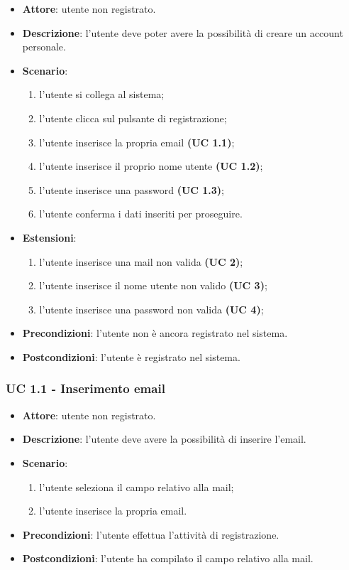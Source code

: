 \begin{itemize}
    \item \textbf{Attore}: utente non registrato.
    \item \textbf{Descrizione}: l'utente deve poter avere la possibilità di creare un account personale.
    \item \textbf{Scenario}:
    \begin{enumerate}
        \item l'utente si collega al sistema;
        \item l'utente clicca sul pulsante di registrazione;
        \item l'utente inserisce la propria email \textbf{(UC 1.1)};
        \item l'utente inserisce il proprio nome utente \textbf{(UC 1.2)};
        \item l'utente inserisce una password \textbf{(UC 1.3)};
        \item l'utente conferma i dati inseriti per proseguire.
    \end{enumerate}
    \item \textbf{Estensioni}: 
        \begin{enumerate}
            \item l'utente inserisce una mail non valida  \textbf{(UC 2)};
            \item l'utente inserisce il nome utente non valido \textbf{(UC 3)};
            \item l'utente inserisce una password non valida \textbf{(UC 4)};
        \end{enumerate}

    \item \textbf{Precondizioni}: l'utente non è ancora registrato nel sistema.
    \item \textbf{Postcondizioni}: l'utente è registrato nel sistema.
\end{itemize}

\subsubsection{UC 1.1 - Inserimento email}
\begin{itemize}
    \item \textbf{Attore}: utente non registrato.
    \item \textbf{Descrizione}: l'utente deve avere la possibilità di inserire l'email.
    \item \textbf{Scenario}:
    \begin{enumerate}
        \item l'utente seleziona il campo relativo alla mail;
        \item l'utente inserisce la propria email.
    \end{enumerate}

    \item \textbf{Precondizioni}: l'utente effettua l'attività di registrazione.
    \item \textbf{Postcondizioni}: l'utente ha compilato il campo relativo alla mail.
\end{itemize}

